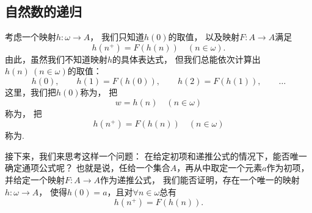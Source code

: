 \subsection{自然数的递归}
考虑一个映射\(h\colon \omega \to A\)，
我们只知道\(h(0)\)的取值，
以及映射\(F\colon A \to A\)满足\begin{equation*}
	h(n^+) = F(h(n))
	\quad(n\in\omega).
\end{equation*}
由此，虽然我们不知道映射\(h\)的具体表达式，
但我们总能依次计算出\(h(n)\ (n\in\omega)\)的取值：\begin{equation*}
	h(0), \qquad
	h(1) = F(h(0)), \qquad
	h(2) = F(h(1)), \qquad
	\dotsc
\end{equation*}
这里，我们把\(h(0)\)称为，
把\begin{equation*}
	w = h(n) \quad(n\in\omega)
\end{equation*}称为，
把\begin{equation*}
	h(n^+) = F(h(n)) \quad(n\in\omega)
\end{equation*}称为.

接下来，我们来思考这样一个问题：
在给定初项和递推公式的情况下，能否唯一确定通项公式呢？
也就是说，任给一个集合\(A\)，再从中取定一个元素\(a\)作为初项，
并给定一个映射\(F\colon A \to A\)作为递推公式，
我们能否证明，存在一个唯一的映射\(h\colon \omega \to A\)，
使得\(h(0) = a\)，且对\(\forall n\in\omega\)总有\begin{equation*}
	h(n^+) = F(h(n)).
\end{equation*}

